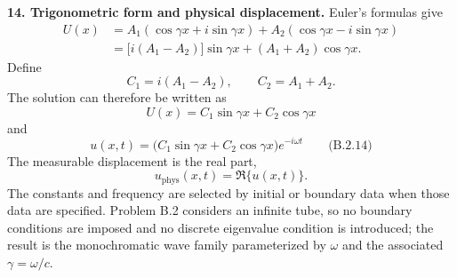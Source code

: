 \textbf{14. Trigonometric form and physical displacement.} Euler's formulas give
\[
\begin{aligned}
U(x)
&=A_1(\cos\gamma x+i\sin\gamma x)+A_2(\cos\gamma x-i\sin\gamma x)\\
&=\bigl[i(A_1-A_2)\bigr]\sin\gamma x+(A_1+A_2)\cos\gamma x.
\end{aligned}
\]
Define
\[
C_1=i(A_1-A_2),\qquad C_2=A_1+A_2.
\]
The solution can therefore be written as
\[
\boxed{
U(x)=C_1\sin\gamma x+C_2\cos\gamma x
}
\]
and
\[
\boxed{
u(x,t)=\bigl(C_1\sin\gamma x+C_2\cos\gamma x\bigr)e^{-i\omega t}
}\qquad\text{(B.2.14)}
\]
The measurable displacement is the real part,
\[
\boxed{u_{\mathrm{phys}}(x,t)=\Re\{u(x,t)\}.}
\]
The constants and frequency are selected by initial or boundary data when those data are specified. Problem B.2 considers an infinite tube, so no boundary conditions are imposed and no discrete eigenvalue condition is introduced; the result is the monochromatic wave family parameterized by $\omega$ and the associated $\gamma=\omega/c$.
